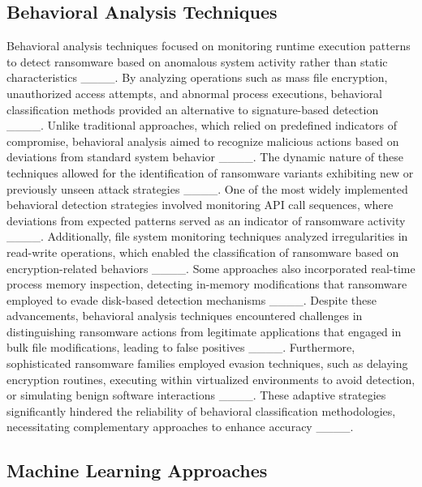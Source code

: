 \subsection{Behavioral Analysis Techniques}

Behavioral analysis techniques focused on monitoring runtime execution patterns to detect ransomware based on anomalous system activity rather than static characteristics ____. By analyzing operations such as mass file encryption, unauthorized access attempts, and abnormal process executions, behavioral classification methods provided an alternative to signature-based detection ____. Unlike traditional approaches, which relied on predefined indicators of compromise, behavioral analysis aimed to recognize malicious actions based on deviations from standard system behavior ____. The dynamic nature of these techniques allowed for the identification of ransomware variants exhibiting new or previously unseen attack strategies ____. One of the most widely implemented behavioral detection strategies involved monitoring API call sequences, where deviations from expected patterns served as an indicator of ransomware activity ____. Additionally, file system monitoring techniques analyzed irregularities in read-write operations, which enabled the classification of ransomware based on encryption-related behaviors ____. Some approaches also incorporated real-time process memory inspection, detecting in-memory modifications that ransomware employed to evade disk-based detection mechanisms ____. Despite these advancements, behavioral analysis techniques encountered challenges in distinguishing ransomware actions from legitimate applications that engaged in bulk file modifications, leading to false positives ____. Furthermore, sophisticated ransomware families employed evasion techniques, such as delaying encryption routines, executing within virtualized environments to avoid detection, or simulating benign software interactions ____. These adaptive strategies significantly hindered the reliability of behavioral classification methodologies, necessitating complementary approaches to enhance accuracy ____.

\subsection{Machine Learning Approaches}

